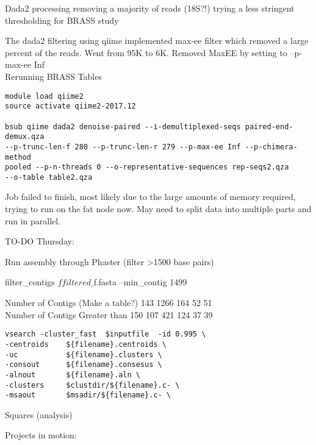 \documentclass[idxtotoc,hyperref,openany,oneside]{labbook} %
\begin{document}
Dada2 processing removing a majority of reads (18S?!) trying a less stringent thresholding for BRASS study



The dada2 filtering using qiime implemented max-ee filter which removed a large percent of the reads. Went from 95K to 6K. Removed MaxEE by setting to --p-max-ee Inf
\\

Rerunning BRASS Tables
\begin{verbatim}
module load qiime2
source activate qiime2-2017.12

bsub qiime dada2 denoise-paired --i-demultiplexed-seqs paired-end-demux.qza 
--p-trunc-len-f 280 --p-trunc-len-r 279 --p-max-ee Inf --p-chimera-method 
pooled --p-n-threads 0 --o-representative-sequences rep-seqs2.qza 
--o-table table2.qza
\end{verbatim}

Job failed to finish, most likely due to the large amounts of memory required, trying to run on the fat node now. May need to split data into multiple parts and run in parallel. 


TO-DO
Thursday:



Run assembly through Phaster (filter >1500 base pairs)

filter\_contigs $f filtered\_$f.fasta --min\_contig 1499

Number of Contigs (Make a table?)
143
1266
164
52
51 \\
Number of Contigs Greater than 150
107
421
124
37
39



\begin{verbatim}
vsearch -cluster_fast  $inputfile  -id 0.995 \
-centroids    ${filename}.centroids \
-uc           ${filename}.clusters \
-consout      ${filename}.consesus \
-alnout       ${filename}.aln \
-clusters     $clustdir/${filename}.c- \
-msaout       $msadir/${filename}.c- \
\end{verbatim}

\labday{Week of September 10 2018}

Squares (analysis) 


Projects in motion:
\end{document}
